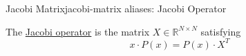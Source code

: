 \begin{definition}{Jacobi Matrix}{jacobi-matrix}
  aliases: Jacobi Operator

  The \href{https://en.wikipedia.org/wiki/Jacobi_operator}{Jacobi
    operator} is the matrix \(X \in \mathbb{R}^{N \times N}\) satisfying
  \[x \cdot P(x) = P(x) \cdot X^T\]
\end{definition}

